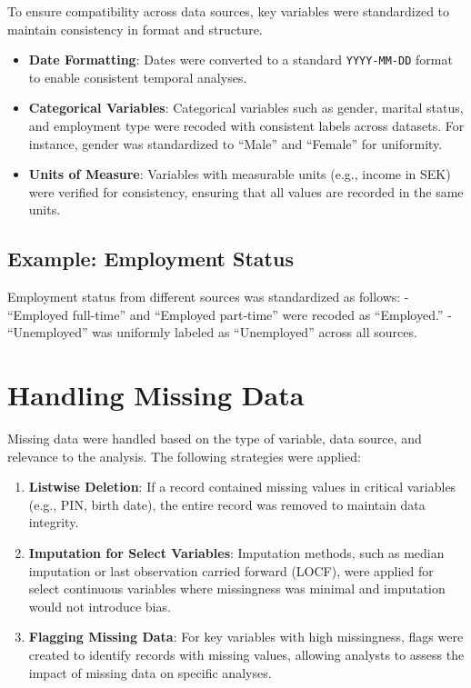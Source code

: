 \documentclass[
]{book}
\providecommand{\tightlist}{%
  \setlength{\itemsep}{0pt}\setlength{\parskip}{0pt}}
\begin{document}
To ensure compatibility across data sources, key variables were standardized to maintain consistency in format and structure.

\begin{itemize}
\tightlist
\item
  \textbf{Date Formatting}: Dates were converted to a standard \texttt{YYYY-MM-DD} format to enable consistent temporal analyses.
\item
  \textbf{Categorical Variables}: Categorical variables such as gender, marital status, and employment type were recoded with consistent labels across datasets. For instance, gender was standardized to ``Male'' and ``Female'' for uniformity.
\item
  \textbf{Units of Measure}: Variables with measurable units (e.g., income in SEK) were verified for consistency, ensuring that all values are recorded in the same units.
\end{itemize}

\hypertarget{example-employment-status}{%
\subsection{Example: Employment Status}\label{example-employment-status}}

Employment status from different sources was standardized as follows:
- ``Employed full-time'' and ``Employed part-time'' were recoded as ``Employed.''
- ``Unemployed'' was uniformly labeled as ``Unemployed'' across all sources.

\hypertarget{handling-missing-data}{%
\section{Handling Missing Data}\label{handling-missing-data}}

Missing data were handled based on the type of variable, data source, and relevance to the analysis. The following strategies were applied:

\begin{enumerate}
\def\labelenumi{\arabic{enumi}.}
\tightlist
\item
  \textbf{Listwise Deletion}: If a record contained missing values in critical variables (e.g., PIN, birth date), the entire record was removed to maintain data integrity.
\item
  \textbf{Imputation for Select Variables}: Imputation methods, such as median imputation or last observation carried forward (LOCF), were applied for select continuous variables where missingness was minimal and imputation would not introduce bias.
\item
  \textbf{Flagging Missing Data}: For key variables with high missingness, flags were created to identify records with missing values, allowing analysts to assess the impact of missing data on specific analyses.
\end{enumerate}
\end{document}
